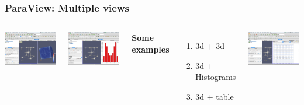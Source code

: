 \documentclass[]{beamer}
\begin{document}
\begin{frame}
\frametitle{ParaView: Multiple views}
\begin{columns}
\begin{minipage}[c][0.4\textheight][c]{\linewidth}
  \centering
  \includegraphics[width=0.8\linewidth]{pics/3d_plus_3d}
\end{minipage}
\begin{minipage}[c][0.4\textheight][c]{\linewidth}
  \centering
  \includegraphics[width=0.8\linewidth]{pics/Multiple_views}
\end{minipage}
\begin{minipage}[c][0.4\textheight][c]{\linewidth}
  \textbf{Some examples}
  \begin{enumerate}
  \item 3d + 3d
  \item 3d + Histograms
  \item 3d + table
  \end{enumerate}
\end{minipage}
\begin{minipage}[c][0.4\textheight][c]{\linewidth}
  \centering
  \includegraphics[width=0.8\linewidth]{pics/3d_plus_table}

\end{minipage}
\end{columns}
\end{frame}
\end{document}
